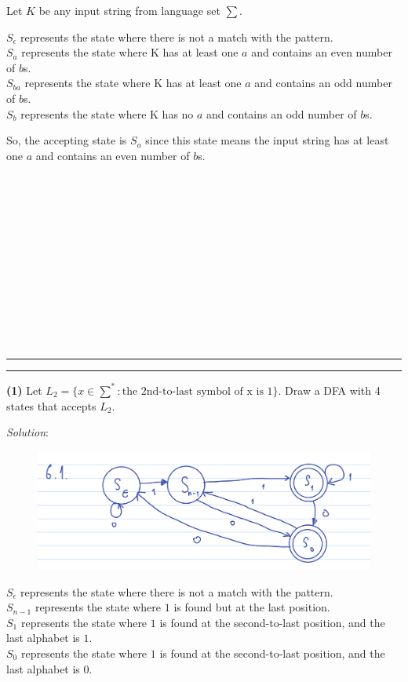 \documentclass[a4paper, 11pt]{article}
\newcommand{\question}[2] {\vspace{.25in} \hrule\vspace{0.5em}
	\noindent{\bf #1: #2} \vspace{0.5em}
	\hrule \vspace{.10in}}
\renewcommand{\part}[1] {\vspace{.10in} {\bf (#1)}}
\begin{document}
	Let $K$ be any input string from language set $\sum$.
	
	$S_\epsilon$ represents the state where there is not a match with the pattern.\\
	$S_a$ represents the state where K has at least one $a$ and contains an even number of $b$s.\\
	$S_{ba}$ represents the state where K has at least one $a$ and contains an odd number of $b$s.\\
	$S_b$ represents the state where K has no $a$ and contains an odd number of $b$s.
	
	So, the accepting state is $S_a$ since this state means the input string has at least one $a$ and contains an even number of $b$s.
	\\\\\\\\\\\\\\\\\\\\\\\\\\
	
	
	\question{6}{All The Same?}
	\part{1} Let $L_2 = \{x \in \sum^{*}: \text{the 2nd-to-last symbol of x is 1}\}$. Draw a DFA with 4 states that accepts $L_2$.
	
	{\em Solution}:
	\begin{figure}[htbp]
		\centering
		\includegraphics[width=\linewidth]{figures/4.jpg}
	\end{figure}
	
	$S_\epsilon$ represents the state where there is not a match with the pattern.\\
	$S_{n-1}$ represents the state where $1$ is found but at the last position.\\
	$S_{1}$ represents the state where $1$ is found at the second-to-last position, and the last alphabet is $1$.\\
	$S_0$ represents the state where $1$ is found at the second-to-last position, and the last alphabet is $0$.\\
	
\end{document}
